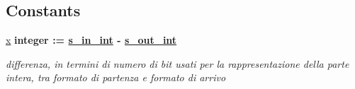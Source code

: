 \subsection*{Constants}
 \begin{DoxyCompactItemize}
\item 
\hyperlink{group___truncate_ga63701d8af27da7452a7588efcff357bc}{x} {\bfseries \textcolor{vhdlchar}{integer}\textcolor{vhdlchar}{ }\textcolor{vhdlchar}{ }\textcolor{vhdlchar}{\+:}\textcolor{vhdlchar}{=}\textcolor{vhdlchar}{ }\textcolor{vhdlchar}{ }\textcolor{vhdlchar}{ }\textcolor{vhdlchar}{ }{\bfseries \hyperlink{group___truncate_gabe72b503b8140ab0d84911165e959b53}{s\+\_\+in\+\_\+int}} \textcolor{vhdlchar}{-\/}\textcolor{vhdlchar}{ }\textcolor{vhdlchar}{ }\textcolor{vhdlchar}{ }{\bfseries \hyperlink{group___truncate_ga4ca792ca981e2f9d82bf36d9c82c08af}{s\+\_\+out\+\_\+int}} \textcolor{vhdlchar}{ }} 
\begin{DoxyCompactList}\small\item\em differenza, in termini di numero di bit usati per la rappresentazione della parte intera, tra formato di partenza e formato di arrivo \end{DoxyCompactList}\end{DoxyCompactItemize}
